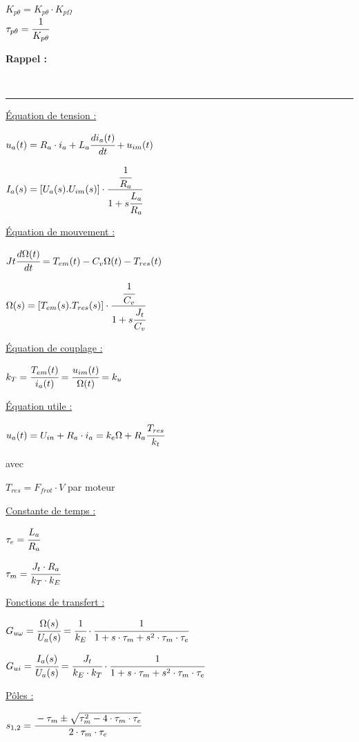 \documentclass[	DIV=calc,%
							paper=a4,%
							fontsize=10pt,%
							twocolumn]{scrartcl} %
\newcounter{mycounter}
\newcommand{\formdesc}[1]{\large\textbf{#1} \addtocounter{mycounter}{1} \hfill \themycounter \\ \vspace{-3mm} \hrule \vspace{2mm}}
\newcommand{\formtitle}[1]{\large\underline{#1}}
\begin{document}
$K_{p\theta} =  K_{p\theta} \cdot K_{p\Omega}$\\


$\tau_{p\theta} =  \cfrac{1}{K_{p\theta}}$


\newpage

\formdesc{Rappel : }

\formtitle{Équation de tension : }

{\hfill $u_a(t) = R_a \cdot i_a + L_a \cfrac{di_a(t)}{dt}+u_{im}(t)$\hfill}

{\hfill $I_a(s) = [U_a(s).U_{im}(s)] \cdot \cfrac{ \cfrac{1}{R_a}}{1+s\cfrac{L_a}{R_a}}  $\hfill}


\formtitle{Équation de mouvement :} 

\vspace{3mm}

{\hfill $Jt \cfrac{d\Omega(t)}{dt} = T_{em}(t) - C_v \Omega(t) - T_{res}(t) $\hfill}

{\hfill $\Omega(s) = [T_{em}(s).T_{res}(s)] \cdot \cfrac{ \cfrac{1}{C_v}}{1+s\cfrac{J_t}{C_v}}  $\hfill}

\formtitle{Équation de couplage : }

{\hfill $k_T = \cfrac{T_{em}(t)}{i_a(t)} = \cfrac{u_{im}(t)}{\Omega(t) }= k_u$\hfill}

\formtitle{Équation utile : }

{\hfill $u_a(t) = U_{in} + R_a \cdot i_a  = k_e \Omega + R_a \cfrac{T_{res}}{k_t}$\hfill}

avec 

$T_{res} = F_{frot} \cdot V$ par moteur 

\formtitle{Constante de temps  : }

{\hfill $\tau_e = \cfrac{L_a}{R_a}$\hfill}


{\hfill $\tau_m = \cfrac{J_t\cdot R_a}{k_T\cdot k_E}$\hfill}

\formtitle{Fonctions de transfert : }

\vspace{3mm}

{\hfill $G_{u\omega} = \cfrac{\Omega(s)}{U_a(s)} = \cfrac{1}{k_E}\cdot\cfrac{1}{1 + s \cdot \tau_m + s^2 \cdot \tau_m \cdot \tau_e} $\hfill}

\vspace{3mm}
{\hfill $G_{ui} = \cfrac{I_a(s)}{U_a(s)} = \cfrac{J_t}{k_E\cdot k_T}\cdot\cfrac{1}{1 + s \cdot \tau_m + s^2 \cdot \tau_m \cdot \tau_e} $\hfill}

\formtitle{Pôles : }

{\hfill $s_{1,2} = \cfrac{-\tau_m \pm \sqrt{\tau_m^2 - 4 \cdot \tau_m \cdot \tau_e}}{2 \cdot \tau_m \cdot \tau_e} $\hfill}
\end{document}
